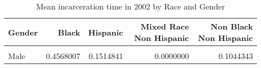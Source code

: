 \begin{table}[H]

\caption{\label{tab:tab:summarystats}Mean incarceration time in 2002 by Race and Gender}
\centering
\begin{tabular}[t]{lrrrr}
\toprule
Gender & Black & Hispanic & Mixed Race Non Hispanic & Non Black Non Hispanic\\
\midrule
\cellcolor{gray!6}{Female} & \cellcolor{gray!6}{0.0205832} & \cellcolor{gray!6}{0.0292208} & \cellcolor{gray!6}{0.1395349} & \cellcolor{gray!6}{0.0186501}\\
Male & 0.4568007 & 0.1514841 & 0.0000000 & 0.1044343\\
\bottomrule
\end{tabular}
\end{table}
